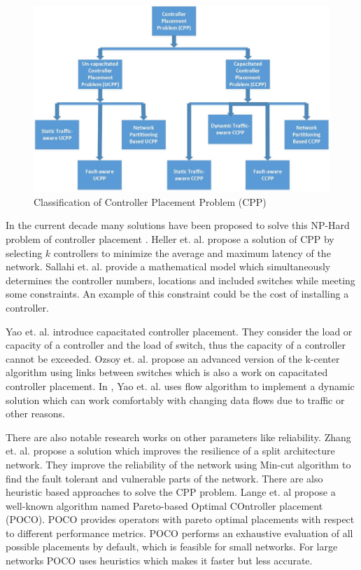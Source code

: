 \documentclass[a4paper,twocolumn,preprint]{elsarticle}
\begin{document}
\begin{figure}
	\includegraphics[width=\linewidth]{cppclassification.jpg}
	\caption{Classification of Controller Placement Problem (CPP)}
	\label{fig:cppclass}
\end{figure}

In the current decade many solutions have been proposed to solve this NP-Hard problem of controller placement \cite{cpp2012heller, cppsurvey2017, cppsurvey2018}. Heller et. al. \cite{cpp2012heller} propose a solution of CPP by selecting $k$ controllers to minimize the average and maximum latency of the network. Sallahi et. al. \cite{sallahi2015optimal} provide a mathematical model which simultaneously determines the controller numbers, locations and included switches while meeting some constraints. An example of this constraint could be the cost of installing a controller.

Yao et. al. \cite{yao2014capacitated} introduce capacitated controller placement. They consider the load or capacity of a controller and the load of switch, thus the capacity of a controller cannot be exceeded. Ozsoy et. al.\cite{ozsoy2006exact} propose an advanced version of the k-center algorithm using links between switches which is also a work on capacitated controller placement. In \cite{yao2015controller}, Yao et. al. uses flow algorithm to implement a dynamic solution which can work comfortably with changing data flows due to traffic or other reasons.

There are also notable research works on other parameters like reliability. Zhang et. al. \cite{zhang2011resilience} propose a solution which improves the resilience of a split architecture network. They improve the reliability of the network using Min-cut algorithm \cite{erlebach2006robustness} to find the fault tolerant and vulnerable parts of the network. There are also heuristic based approaches to solve the CPP problem. Lange et. al\cite{lange2015heuristic} propose a well-known algorithm named Pareto-based Optimal COntroller placement (POCO). POCO provides operators with pareto optimal placements with respect to different performance metrics. POCO performs an exhaustive evaluation of all possible placements by default, which is feasible for small networks. For large networks POCO uses heuristics which makes it faster but less accurate.
\end{document}
